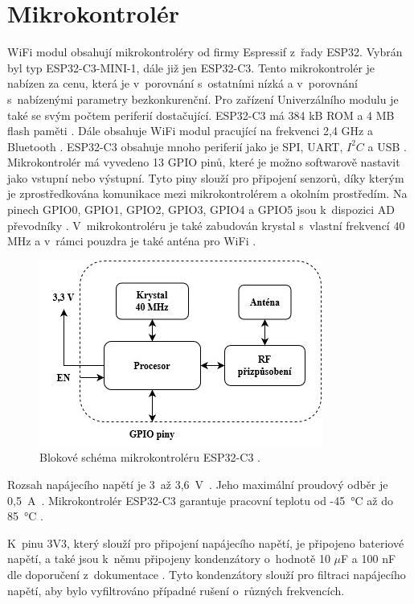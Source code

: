 \section{Mikrokontrolér}
WiFi modul obsahují mikrokontroléry od firmy Espressif z~řady ESP32. Vybrán byl typ ESP32-C3-MINI-1, dále již jen ESP32-C3. Tento mikrokontrolér je nabízen za cenu, která 
je v~porovnání s~ostatními nízká a v~porovnání s~nabízenými parametry bezkonkurenční. Pro zařízení Univerzálního modulu je také se svým počtem periferií dostačující. ESP32-C3 má 
384 kB ROM a 4 MB flash paměti \cite{ESP_C3_dtsh}. Dále obsahuje WiFi modul pracující na frekvenci 2,4 GHz a Bluetooth \cite{ESP_C3_dtsh}. ESP32-C3 obsahuje mnoho periferií
jako je SPI, UART, $I^2C$ a USB \cite{ESP_C3_dtsh}. Mikrokontrolér má vyvedeno 13 GPIO pinů, které je možno softwarově nastavit jako vstupní nebo výstupní. Tyto piny
slouží pro připojení senzorů, díky kterým je zprostředkována komunikace mezi mikrokontrolérem a okolním prostředím. Na pinech GPIO0, GPIO1, GPIO2, GPIO3, GPIO4 a GPIO5 jsou 
k~dispozici AD převodníky \cite{ESP_C3_tech_ref}. V~mikrokontroléru je také zabudován krystal s~vlastní frekvencí 
40 MHz a v~rámci pouzdra je také anténa pro WiFi \cite{ESP_C3_dtsh}.

\begin{figure}[!h]
  \begin{center}
    \includegraphics[scale=0.8]{obrazky/blokove_schema_MCU.jpg}
  \end{center}
  \caption[Blokové schéma mikrokontroléru ESP32-C3]{Blokové schéma mikrokontroléru ESP32-C3 \cite{ESP_C3_dtsh}.}
\end{figure}

Rozsah napájecího napětí je 3~až 3,6~V~\cite{ESP_C3_dtsh}. Jeho maximální proudový odběr je 0,5~A~\cite{ESP_C3_dtsh}. Mikrokontrolér ESP32-C3 garantuje pracovní teplotu 
od -45~°C až do 85~°C \cite{ESP_C3_dtsh}.

K~pinu 3V3, který slouží pro připojení napájecího napětí, je připojeno bateriové napětí, a také jsou k~němu připojeny kondenzátory o~hodnotě 10 $\mu$F a 100 nF dle doporučení z~dokumentace \cite{ESP_C3_dtsh}. Tyto 
kondenzátory slouží pro filtraci napájecího napětí, aby bylo vyfiltrováno případné rušení o~různých frekvencích.

